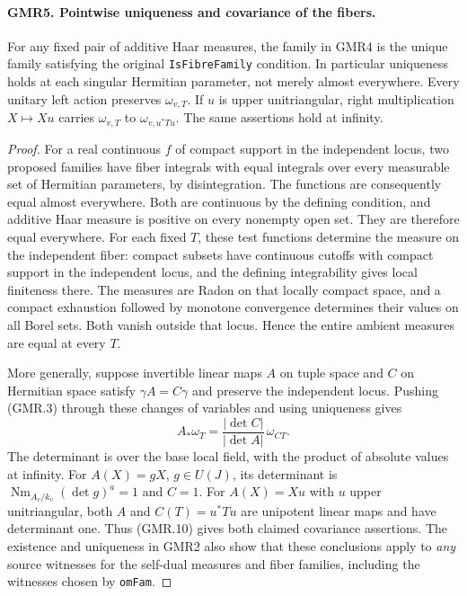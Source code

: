 \documentclass[11pt,a4paper]{article}
\numberwithin{equation}{section}
\theoremstyle{remark}\newtheorem{remark}[theorem]{Remark}
\begin{document}
\paragraph{GMR5. Pointwise uniqueness and covariance of the fibers.}
\label{claim:GMR5}
For any fixed pair of additive Haar measures, the family in GMR4 is
the unique family satisfying the original \texttt{Is\allowbreak Fibre\allowbreak Family} condition.
In particular uniqueness holds at each singular Hermitian parameter,
not merely almost everywhere.  Every unitary left action preserves
$\omega_{v,T}$.  If $u$ is upper unitriangular, right multiplication
$X\mapsto Xu$ carries $\omega_{v,T}$ to $\omega_{v,u^*Tu}$.
The same assertions hold at infinity.

\begin{proof}
For a real continuous $f$ of compact support in the independent locus,
two proposed families have fiber integrals with equal integrals over
every measurable set of Hermitian parameters, by disintegration.
The functions are consequently equal almost everywhere.  Both are
continuous by the defining condition, and additive Haar measure is
positive on every nonempty open set.  They are therefore equal
everywhere.  For each fixed $T$, these test functions determine the
measure on the independent fiber: compact subsets have continuous
cutoffs with compact support in the independent locus, and the
defining integrability gives local finiteness there.  The measures are
Radon on that locally compact space, and a compact exhaustion followed
by monotone convergence determines their values on all Borel sets.
Both vanish outside that locus.  Hence the entire ambient measures
are equal at every $T$.

More generally, suppose invertible linear maps $A$ on tuple space and
$C$ on Hermitian space satisfy $\gamma A=C\gamma$ and preserve the
independent locus.  Pushing (GMR.3) through these changes of variables
and using uniqueness gives
\[
 A_*\omega_T=\frac{|\det C|}{|\det A|}\,\omega_{CT}.
 \tag{GMR.10}
\]
The determinant is over the base local field, with the product of
absolute values at infinity.  For $A(X)=gX$, $g\in U(J)$, its determinant
is $\operatorname{Nm}_{A_v/k_v}(\det g)^a=1$ and $C=1$.
For $A(X)=Xu$ with $u$ upper unitriangular, both $A$ and
$C(T)=u^*Tu$ are unipotent linear maps and have determinant one.
Thus (GMR.10) gives both claimed covariance assertions.  The existence
and uniqueness in GMR2 also show that these conclusions apply to
\emph{any} source witnesses for the self-dual measures and fiber
families, including the witnesses chosen by \texttt{om\allowbreak Fam}.
\end{proof}
\end{document}
